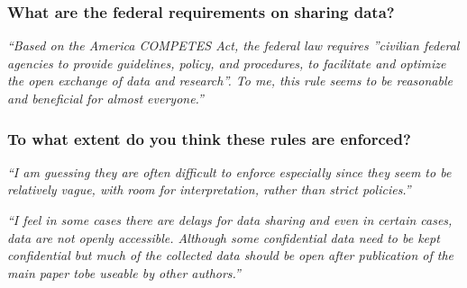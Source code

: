 \documentclass[12pt]{beamer}
\newcommand\ans[1]{{\it ``#1''}}
\newcommand\gap{\vspace{5mm}}
\begin{document}
\begin{frame} %
  \frametitle{ What are the federal requirements on sharing data?}

    \ans{Based on the America COMPETES Act,  the federal law requires ”civilian federal agencies to provide guidelines, policy, and procedures, to facilitate and optimize the open exchange of data and research”.  To me, this rule seems to be reasonable and beneficial for almost everyone.}
    
\end{frame}

\begin{frame} %
  \frametitle{To what extent do you think these rules are enforced?}

  \ans{I am guessing they are often difficult to enforce especially since they seem to be relatively vague, with room for interpretation, rather than strict policies.}

  \gap
  
  \ans{I feel in some cases there are delays for data sharing and even in certain cases, data are not openly accessible.  Although some confidential data need to be kept confidential but much of the collected data should be open after publication of the main paper tobe useable by other authors.}

  







\end{frame}
\end{document}
